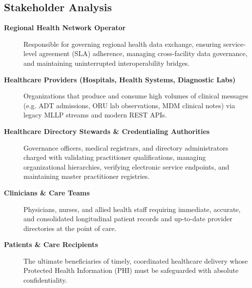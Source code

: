 \subsection{Stakeholder Analysis}
\begin{description}
    \item[\textbf{Regional Health Network Operator}] Responsible for governing regional health data exchange, ensuring service-level agreement (SLA) adherence, managing cross-facility data governance, and maintaining uninterrupted interoperability bridges.
    \item[\textbf{Healthcare Providers (Hospitals, Health Systems, Diagnostic Labs)}] Organizations that produce and consume high volumes of clinical messages (e.g. ADT admissions, ORU lab observations, MDM clinical notes) via legacy MLLP streams and modern REST APIs.
    \item[\textbf{Healthcare Directory Stewards \& Credentialing Authorities}] Governance officers, medical registrars, and directory administrators charged with validating practitioner qualifications, managing organizational hierarchies, verifying electronic service endpoints, and maintaining master practitioner registries.
    \item[\textbf{Clinicians \& Care Teams}] Physicians, nurses, and allied health staff requiring immediate, accurate, and consolidated longitudinal patient records and up-to-date provider directories at the point of care.
    \item[\textbf{Patients \& Care Recipients}] The ultimate beneficiaries of timely, coordinated healthcare delivery whose Protected Health Information (PHI) must be safeguarded with absolute confidentiality.
\end{description}

